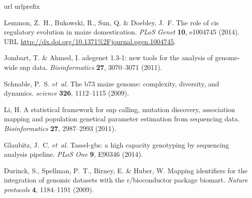 \documentclass[12pt,a4paper]{article}
\newcounter{firstbib} %
\begin{document}

\renewcommand\refname{References (Methods)}

  \begin{thebibliography}{10}
\setcounter{NAT@ctr}{\value{firstbib}}
    \expandafter\ifx\csname url\endcsname\relax
  \def\url#1{\texttt{#1}}\fi
\expandafter\ifx\csname urlprefix\endcsname\relax\def\urlprefix{URL }\fi
\providecommand{\bibinfo}[2]{#2}
\providecommand{\eprint}[2][]{\url{#2}}



\bibinfo{author}{Lemmon, Z.~H.}, \bibinfo{author}{Bukowski, R.},
  \bibinfo{author}{Sun, Q.} \& \bibinfo{author}{Doebley, J.~F.}
\newblock \bibinfo{title}{The role of cis regulatory evolution
  in maize domestication}.
\newblock \emph{\bibinfo{journal}{PLoS Genet}} \textbf{\bibinfo{volume}{10}},
  \bibinfo{pages}{e1004745} (\bibinfo{year}{2014}).
\newblock \urlprefix\url{http://dx.doi.org/10.1371%2Fjournal.pgen.1004745}.

\bibinfo{author}{Jombart, T.} \& \bibinfo{author}{Ahmed, I.}
\newblock \bibinfo{title}{adegenet 1.3-1: new tools for the analysis of
  genome-wide snp data}.
\newblock \emph{\bibinfo{journal}{Bioinformatics}}
  \textbf{\bibinfo{volume}{27}}, \bibinfo{pages}{3070--3071}
  (\bibinfo{year}{2011}).

\bibinfo{author}{Schnable, P.~S.} \emph{et~al.}
\newblock \bibinfo{title}{The b73 maize genome: complexity, diversity, and
  dynamics}.
\newblock \emph{\bibinfo{journal}{science}} \textbf{\bibinfo{volume}{326}},
  \bibinfo{pages}{1112--1115} (\bibinfo{year}{2009}).

\bibinfo{author}{Li, H.}
\newblock \bibinfo{title}{A statistical framework for snp calling, mutation
  discovery, association mapping and population genetical parameter estimation
  from sequencing data}.
\newblock \emph{\bibinfo{journal}{Bioinformatics}}
  \textbf{\bibinfo{volume}{27}}, \bibinfo{pages}{2987--2993}
  (\bibinfo{year}{2011}).

\bibinfo{author}{Glaubitz, J.~C.} \emph{et~al.}
\newblock \bibinfo{title}{Tassel-gbs: a high capacity genotyping by sequencing
  analysis pipeline}.
\newblock \emph{\bibinfo{journal}{PLoS One}} \textbf{\bibinfo{volume}{9}},
  \bibinfo{pages}{E90346} (\bibinfo{year}{2014}).

\bibinfo{author}{Durinck, S.}, \bibinfo{author}{Spellman, P.~T.},
  \bibinfo{author}{Birney, E.} \& \bibinfo{author}{Huber, W.}
\newblock \bibinfo{title}{Mapping identifiers for the integration of genomic
  datasets with the r/bioconductor package biomart}.
\newblock \emph{\bibinfo{journal}{Nature protocols}}
  \textbf{\bibinfo{volume}{4}}, \bibinfo{pages}{1184--1191}
  (\bibinfo{year}{2009}).


\end{thebibliography}
\end{document}
